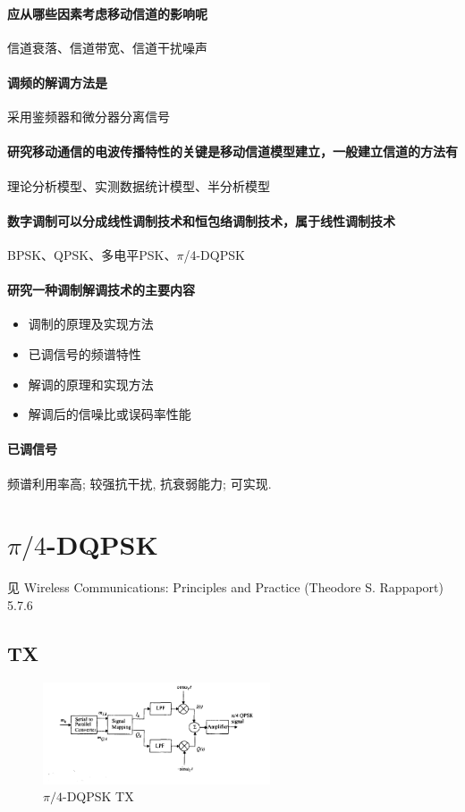 \documentclass[a4paper]{report}
\begin{document}
\paragraph{应从哪些因素考虑移动信道的影响呢}信道衰落、信道带宽、信道干扰噪声
\paragraph{调频的解调方法是}采用鉴频器和微分器分离信号
\paragraph{研究移动通信的电波传播特性的关键是移动信道模型建立，一般建立信道的方法有}理论分析模型、实测数据统计模型、半分析模型
\paragraph{数字调制可以分成线性调制技术和恒包络调制技术，属于线性调制技术}BPSK、QPSK、多电平PSK、$\pi$/4-DQPSK

\paragraph{研究一种调制解调技术的主要内容}
\begin{itemize}
	\item 调制的原理及实现方法
	\item 已调信号的频谱特性
	\item 解调的原理和实现方法
	\item 解调后的信噪比或误码率性能
\end{itemize}

\paragraph{已调信号}频谱利用率高; 较强抗干扰, 抗衰弱能力; 可实现. 



\section{$\pi/4$-DQPSK}
见 Wireless Communications: Principles and Practice (Theodore S. Rappaport) 5.7.6
\subsection{TX}
\begin{figure}[H]
\centering
\includegraphics[width=0.6\textwidth]{dqpsk_pi_4_tx.png}
\caption{$\pi/4$-DQPSK TX}
\end{figure}
\end{document}
